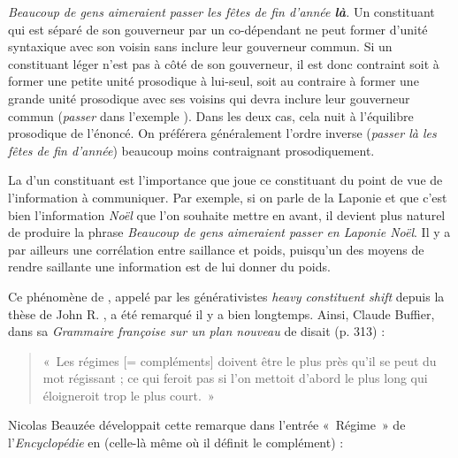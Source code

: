 \ea\label{ex:fetes}
{\itshape Beaucoup de gens aimeraient passer les fêtes de fin d’année \textbf{{là}}.}
\z
Un constituant qui est séparé de son gouverneur par un co-dépendant ne peut former d’unité syntaxique avec son voisin sans inclure leur gouverneur commun. Si un constituant léger n’est pas à côté de son gouverneur, il est donc contraint soit à former une petite unité prosodique à lui-seul, soit au contraire à former une grande unité prosodique avec ses voisins qui devra inclure leur gouverneur commun (\textit{passer} dans l'exemple ). Dans les deux cas, cela nuit à l’équilibre prosodique de l’énoncé. On préférera généralement l’ordre inverse (\textit{passer là les fêtes de fin d’année}) beaucoup moins contraignant prosodiquement.

La  d’un constituant est l’importance que joue ce constituant du point de vue de l’information à communiquer. Par exemple, si on parle de la Laponie et que c’est bien l’information \textit{Noël} que l’on souhaite mettre en avant, il devient plus naturel de produire la phrase \textit{Beaucoup de gens aimeraient passer en Laponie Noël}. Il y a par ailleurs une corrélation entre saillance et poids, puisqu’un des moyens de rendre saillante une information est de lui donner du poids.

Ce phénomène de , appelé par les générativistes \textit{heavy constituent shift} depuis la thèse de John R. \citet{ross1967constraints}, a été remarqué il y a bien longtemps. Ainsi, Claude Buffier, dans sa \textit{Grammaire françoise sur un plan nouveau} de \citeyear{buffier1709grammaire} disait (p. 313) :

\begin{quote}
    «~Les régimes [= compléments] doivent être le plus près qu’il se peut du mot régissant ; ce qui feroit pas si l’on mettoit d’abord le plus long qui éloigneroit trop le plus court.~»
\end{quote}
Nicolas Beauzée développait cette remarque dans l’entrée «~Régime~» de l’\textit{Ency\-clo\-pédie} en \citeyear{Beauzée1765} (celle-là même où il définit le complément) :

